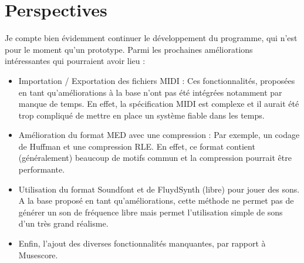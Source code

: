 \documentclass[12pt]{report}
\begin{document}
\chapter{Perspectives} %
Je compte bien évidemment continuer le développement du programme, qui n'est pour le moment qu'un prototype. Parmi les prochaines améliorations intéressantes qui pourraient avoir lieu :\\
\begin{itemize}
 \item Importation / Exportation des fichiers MIDI : Ces fonctionnalités, proposées en tant qu'améliorations à la base n'ont pas été intégrées notamment par manque de temps. En effet, la spécification MIDI
 est complexe et il aurait été trop compliqué de mettre en place un système fiable dans les temps.\\
 \item Amélioration du format MED avec une compression : Par exemple, un codage de Huffman et une compression RLE. En effet, ce format contient (généralement) beaucoup de motifs commun et la compression
 pourrait être performante.\\
 \item Utilisation du format Soundfont et de FluydSynth (libre) pour jouer des sons. A la base proposé en tant qu'améliorations, cette méthode ne permet pas de générer un son de fréquence libre mais permet
 l'utilisation simple de sons d'un très grand réalisme.\\
 \item Enfin, l'ajout des diverses fonctionnalités manquantes, par rapport à Musescore.\\
\end{itemize}
\end{document}
